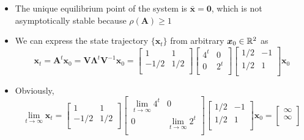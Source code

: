 \documentclass[12pt,a4paper]{article}
\begin{document}
\begin{itemize}
\begin{itemize}
  \item The unique equilibrium point of the system is $\bar{\bm{x}}=\bm{0}$,
    which is not asymptotically stable because $\rho(\bm{A})\geq 1$

  \item We can express the state trajectory $\{\bm{x}_{t}\}$ from arbitrary $\bm{x}_{0}\in \mathbb{R}^{2}$ as
      \begin{equation}\nonumber%
        \bm{x}_{t} =
        \bm{A}^{t}\bm{x}_{0}
        =
        \bm{V}\bm{\Lambda}^{t}\bm{V}^{-1}\bm{x}_{0}
        =
      \begin{bmatrix}
        1 & 1 \\
        -1/2 & 1/2 \\
      \end{bmatrix}
      \begin{bmatrix}
        4^{t} & 0 \\
        0 & 2^{t} \\
      \end{bmatrix}
      \begin{bmatrix}
        1/2 & -1 \\
        1/2 & 1 \\
      \end{bmatrix}
      \bm{x}_{0}
    \end{equation}
  \item Obviously,
    \begin{equation}\nonumber%
      \lim_{t\to \infty}\bm{x}_{t} =
      \begin{bmatrix}
        1 & 1 \\
        -1/2 & 1/2 \\
      \end{bmatrix}
      \begin{bmatrix}
        \lim_{t\to\infty}4^{t} & 0 \\
        0 & \lim_{t\to\infty}2^{t} \\
      \end{bmatrix}
      \begin{bmatrix}
        1/2 & -1 \\
        1/2 & 1 \\
      \end{bmatrix}
      \bm{x}_{0}
      =
      \begin{bmatrix}
        \infty \\
        \infty \\
      \end{bmatrix}
    \end{equation}

\end{itemize}
\end{itemize}
\end{document}
